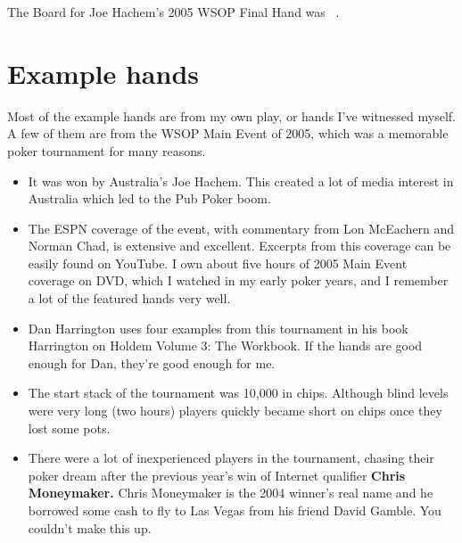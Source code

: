 The Board for Joe Hachem's 2005 WSOP Final Hand was
\sixh\fived\fourd\As\fourc\ .

\section*{Example hands}

Most of the example hands are from my own play, or hands I've
witnessed myself. A few of them are from the WSOP Main Event
of 2005, which was a memorable poker tournament for many reasons.

\begin{itemize}
  \item It was won by Australia's Joe Hachem. This created a lot of
    media interest in Australia which led to the Pub Poker boom.
  \item The ESPN coverage of the event, with commentary from
    Lon McEachern and Norman Chad, is extensive and
    excellent. Excerpts from this coverage can be easily found on
    YouTube. I own about five hours of 2005 Main Event coverage on
    DVD, which I watched in my early poker years, and I remember a lot
    of the featured hands very well.
  \item Dan Harrington uses four examples from this tournament in his
    book Harrington on Holdem Volume 3: The Workbook. If the hands are
    good enough for Dan, they're good enough for me.
  \item The start stack of the tournament was 10,000 in
    chips. Although blind levels were very long (two hours)
    players quickly became short on chips once they lost some pots.
  \item There were a lot of inexperienced players in the tournament,
    chasing their poker dream after the previous year's win of
    Internet qualifier \textbf{Chris Moneymaker.} Chris Moneymaker is
    the 2004 winner's real name and he borrowed some cash to fly to
    Las Vegas from his friend David Gamble. You couldn't make this up.

\end{itemize}



